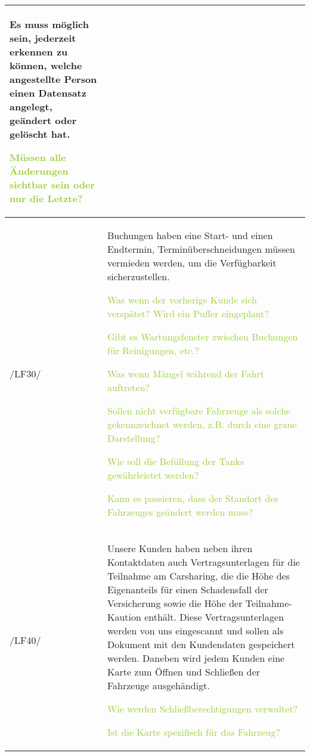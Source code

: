 \begin{tabular}{l | p{13cm}}
    \textcolor{NavyBlue}{}

    Es muss möglich sein, jederzeit erkennen zu können, welche angestellte Person   einen Datensatz angelegt, geändert oder gelöscht hat. 
    
    \textcolor{YellowGreen}{Müssen alle Änderungen sichtbar sein oder nur die Letzte?}

    \textcolor{NavyBlue}{}
    \\
    \hline
    /LF30/ & Buchungen haben eine Start- und einen Endtermin, Terminüberschneidungen müssen vermieden werden, um die Verfügbarkeit sicherzustellen. 
    
    \textcolor{YellowGreen}{Was wenn der vorherige Kunde sich verspätet? Wird ein Puffer eingeplant?}

    \textcolor{NavyBlue}{}

    \textcolor{YellowGreen}{Gibt es Wartungsfenster zwischen Buchungen für Reinigungen, etc.?}

    \textcolor{NavyBlue}{}

    \textcolor{YellowGreen}{Was wenn Mängel während der Fahrt auftreten?}

    \textcolor{NavyBlue}{}

    \textcolor{YellowGreen}{Sollen nicht verfügbare Fahrzeuge als solche gekennzeichnet werden, z.B. durch eine graue Darstellung?}

    \textcolor{NavyBlue}{}

    \textcolor{YellowGreen}{Wie soll die Befüllung der Tanks gewährleistet werden?}

    \textcolor{NavyBlue}{}

    \textcolor{YellowGreen}{Kann es passieren, dass der Standort des Fahrzeuges geändert werden muss?}

    \textcolor{NavyBlue}{}
    \\
    \hline
    /LF40/ & Unsere Kunden haben neben ihren Kontaktdaten auch Vertragsunterlagen für die Teilnahme am Carsharing, die die Höhe des Eigenanteils für einen Schadensfall der Versicherung sowie die Höhe der Teilnahme-Kaution enthält. Diese Vertragsunterlagen werden von uns eingescannt und sollen als Dokument mit den Kundendaten gespeichert werden. Daneben wird jedem Kunden eine Karte zum Öffnen und Schließen der Fahrzeuge ausgehändigt. 

    \textcolor{YellowGreen}{Wie werden Schließberechtigungen verwaltet?}

    \textcolor{NavyBlue}{}

    \textcolor{YellowGreen}{Ist die Karte spezifisch für das Fahrzeug?}


\end{tabular}
